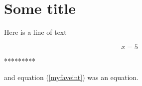 \documentclass{article}
\begin{document}
\section{Some title}

Here is a line of text


\begin{equation} \label{eu_eqn}
x=5
\end{equation}


*********



and equation (\ref{myfaveint}) was an equation.
\end{document}
